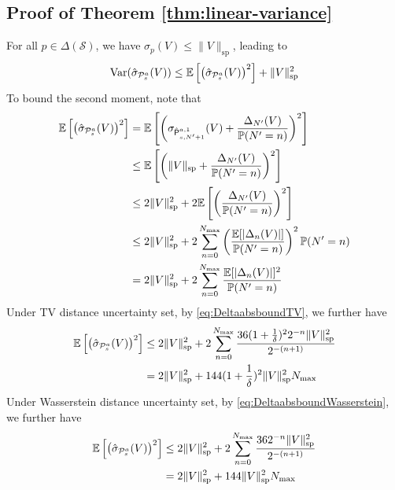 \subsection{Proof of Theorem \ref{thm:linear-variance}} \label{proof:linear-variance}
For all $p\in\Delta(\mathcal{S})$, we have $\sigma_p(V)\leq \|V\|_{\mathrm{sp}}$, leading to 
\begin{equation}
    \mathrm{Var}(\hat{\sigma}_{\mathcal{P}^a_s}(V)) \leq \mathbb{E}\left[\left(\hat{\sigma}_{\mathcal{P}^a_s}(V)\right)^2\right] + \|V\|^2_{\mathrm{sp}}
\end{equation}
To bound the second moment, note that 
\begin{align}
    \mathbb{E}\left[\left(\hat{\sigma}_{\mathcal{P}^a_s}(V)\right)^2\right] &= \mathbb{E}\left[\left(\sigma_{\hat{\mathsf P}^{a,1}_{s,N'+1}}(V)+\frac{\Delta_{N'}(V)}{  \mathbb{P}(N' = n) }\right)^2\right] \nonumber\\
    &\leq\mathbb{E}\left[\left(\|V\|_{\mathrm{sp}}+\frac{\Delta_{N'}(V)}{  \mathbb{P}(N' = n) }\right)^2\right] \nonumber\\
    &\leq 2\|V\|_{\mathrm{sp}}^2 + 2\mathbb{E}\left[\left(\frac{\Delta_{N'}(V)}{  \mathbb{P}(N' = n) }\right)^2\right]\nonumber\\
    &\leq 2\|V\|_{\mathrm{sp}}^2 + 2\sum_{n=0}^{N_{\max}}\left(\frac{\mathbb{E}[|\Delta_{n}(V)|]}{  \mathbb{P}(N' = n) }\right)^2 \mathbb{P}(N' = n)\nonumber\\
    &= 2\|V\|_{\mathrm{sp}}^2 + 2\sum_{n=0}^{N_{\max}}\frac{\mathbb{E}[|\Delta_{n}(V)|]^2}{  \mathbb{P}(N' = n) }
    \end{align}
Under TV distance uncertainty set, by \eqref{eq:DeltaabsboundTV}, we further have
    \begin{align}
    \mathbb{E}\left[\left(\hat{\sigma}_{\mathcal{P}^a_s}(V)\right)^2\right] &\leq 2\|V\|_{\mathrm{sp}}^2 + 2\sum_{n=0}^{N_{\max}}\frac{36(1+\frac{1}{\delta})^2 2^{-n}\|V\|_{\mathrm{sp}}^2}{2^{-(n+1)}}  \nonumber\\
    &= 2\|V\|_{\mathrm{sp}}^2 + 144(1+\frac{1}{\delta})^2\|V\|_{\mathrm{sp}}^2 N_{\max}
\end{align}
Under Wasserstein distance uncertainty set, by \eqref{eq:DeltaabsboundWasserstein}, we further have
    \begin{align}
    \mathbb{E}\left[\left(\hat{\sigma}_{\mathcal{P}^a_s}(V)\right)^2\right] &\leq 2\|V\|_{\mathrm{sp}}^2 + 2\sum_{n=0}^{N_{\max}}\frac{36 2^{-n}\|V\|_{\mathrm{sp}}^2}{2^{-(n+1)}}  \nonumber\\
    &= 2\|V\|_{\mathrm{sp}}^2 + 144\|V\|_{\mathrm{sp}}^2 N_{\max}
\end{align}


